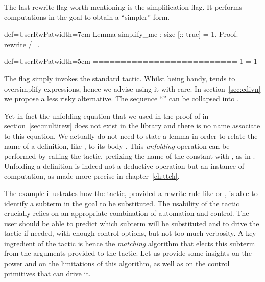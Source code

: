 
The last rewrite flag worth mentioning is the \C{/=} simplification
flag.  It performs computations in the goal to obtain a ``simpler'' form.

\begin{coq}{def=UserRwPat}{width=7cm}
Lemma simplify_me : size [:: true] = 1.
Proof.
rewrite /=.
\end{coq}
\begin{coqout}{def=UserRwPat}{width=5cm}
==========================
1 = 1
\end{coqout}
The \C{/=} flag simply invokes the \Coq{} standard 
tactic.  Whilst being handy,  tends to oversimplify
expressions, hence we advise using it with care.
In section~\ref{sec:edivn} we propose a less risky alternative.
The sequence ``\C{// /=}'' can be collapsed into \C{//=}.

Yet in fact the unfolding equation  that we used in
the proof of  in section~\ref{sec:multirew}
does not exist in the library and there is no name associate to this
equation. We actually do not need to state a lemma in order to relate
the name of a definition, like , to its body
. This \emph{unfolding} operation can be
performed by calling the  tactic, prefixing the name of the
constant with \C{/}, as in . Unfolding a definition is
indeed not a deductive operation but an instance of computation, as
made more precise in chapter~\ref{ch:ttch}.

\label{sec:rewrite2}

The example  illustrates how the  tactic, provided a
rewrite rule like  or , is able
to identify a
subterm in the goal to be substituted. The usability of the
tactic crucially relies on an appropriate combination of automation
and control. The user should be able to predict which subterm will be
substituted and to drive the tactic if needed, with enough control
options, but not too much verbosity. A key ingredient of the
 tactic is hence the \emph{matching} algorithm that
elects this subterm from the arguments provided to the tactic. Let us
provide some insights on the power and on the limitations of this
algorithm, as well as on the control primitives that can drive it.

